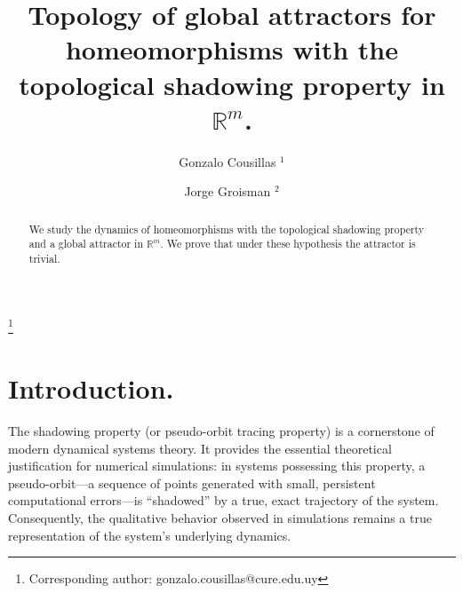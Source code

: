\documentclass{amsart}
\newcommand{\R}{{\mathbb{R}}}
\begin{document}
	\title[Top. of global attractors for homeos with TSP.]{Topology of  global attractors for  homeomorphisms with the topological shadowing property in $\R^m$.}
	\author[1]{Gonzalo Cousillas $^1$}	 
	\address[$^1$]{Departamento de Matemática y Aplicaciones, Centro Universitario Regional Este, Universidad de la República, Maldonado, Uruguay.}
	\thanks{Corresponding author: gonzalo.cousillas@cure.edu.uy}
	
	
	\author[]{Jorge Groisman $^2$}
	\address[$^2$]{ Instituto de Matemática y Estadística ``Rafael Laguardia'', Facultad de Ingenier\'{\i}a,  Universidad de la Rep\'ublica, Montevideo, Uruguay.}
	
	\maketitle
	
\begin{abstract}  We study the dynamics of  homeomorphisms with the  topological shadowing property and a  global attractor in $\R^m$. 
	We prove that under these hypothesis the attractor is trivial.		
\end{abstract}



\section{Introduction.}


The shadowing property (or pseudo-orbit tracing property) is a cornerstone of modern dynamical systems theory. It provides the essential theoretical justification for numerical simulations: in systems possessing this property, a pseudo-orbit—a sequence of points generated with small, persistent computational errors—is ``shadowed'' by a true, exact trajectory of the system. Consequently, the qualitative behavior observed in simulations remains a true representation of the system's underlying dynamics.
\end{document}
